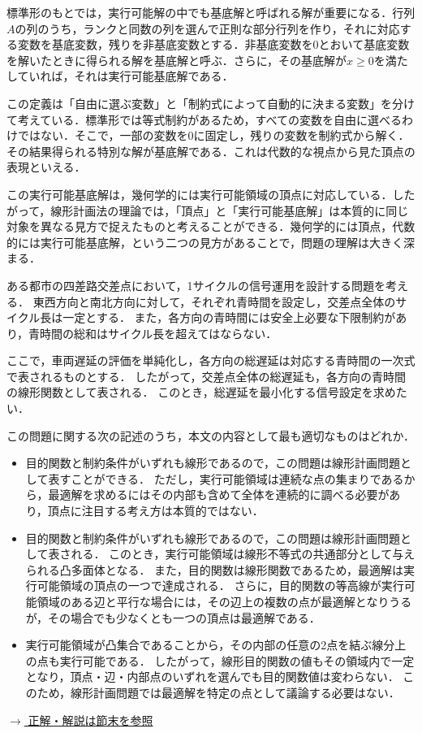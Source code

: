 標準形のもとでは，実行可能解の中でも基底解と呼ばれる解が重要になる．行列$A$の列のうち，ランクと同数の列を選んで正則な部分行列を作り，それに対応する変数を基底変数，残りを非基底変数とする．非基底変数を0とおいて基底変数を解いたときに得られる解を基底解と呼ぶ．さらに，その基底解が$x\ge 0$を満たしていれば，それは実行可能基底解である．

この定義は「自由に選ぶ変数」と「制約式によって自動的に決まる変数」を分けて考えている．標準形では等式制約があるため，すべての変数を自由に選べるわけではない．そこで，一部の変数を0に固定し，残りの変数を制約式から解く．その結果得られる特別な解が基底解である．これは代数的な視点から見た頂点の表現といえる．

この実行可能基底解は，幾何学的には実行可能領域の頂点に対応している．したがって，線形計画法の理論では，「頂点」と「実行可能基底解」は本質的に同じ対象を異なる見方で捉えたものと考えることができる．幾何学的には頂点，代数的には実行可能基底解，という二つの見方があることで，問題の理解は大きく深まる．


\begin{example}[title={クイズ2：信号制御}]
ある都市の四差路交差点において，1サイクルの信号運用を設計する問題を考える．
東西方向と南北方向に対して，それぞれ青時間を設定し，交差点全体のサイクル長は一定とする．
また，各方向の青時間には安全上必要な下限制約があり，青時間の総和はサイクル長を超えてはならない．

ここで，車両遅延の評価を単純化し，各方向の総遅延は対応する青時間の一次式で表されるものとする．
したがって，交差点全体の総遅延も，各方向の青時間の線形関数として表される．
このとき，総遅延を最小化する信号設定を求めたい．

この問題に関する次の記述のうち，本文の内容として最も適切なものはどれか．

\begin{itemize}
\item[(ア)]
目的関数と制約条件がいずれも線形であるので，この問題は線形計画問題として表すことができる．
ただし，実行可能領域は連続な点の集まりであるから，最適解を求めるにはその内部も含めて全体を連続的に調べる必要があり，頂点に注目する考え方は本質的ではない．

\item[(イ)]
目的関数と制約条件がいずれも線形であるので，この問題は線形計画問題として表される．
このとき，実行可能領域は線形不等式の共通部分として与えられる凸多面体となる．
また，目的関数は線形関数であるため，最適解は実行可能領域の頂点の一つで達成される．
さらに，目的関数の等高線が実行可能領域のある辺と平行な場合には，その辺上の複数の点が最適解となりうるが，その場合でも少なくとも一つの頂点は最適解である．

\item[(ウ)]
実行可能領域が凸集合であることから，その内部の任意の2点を結ぶ線分上の点も実行可能である．
したがって，線形目的関数の値もその領域内で一定となり，頂点・辺・内部点のいずれを選んでも目的関数値は変わらない．
このため，線形計画問題では最適解を特定の点として議論する必要はない．
\end{itemize}

\hyperref[ans:lp2]{$\rightarrow$ 正解・解説は節末を参照}
\end{example}


